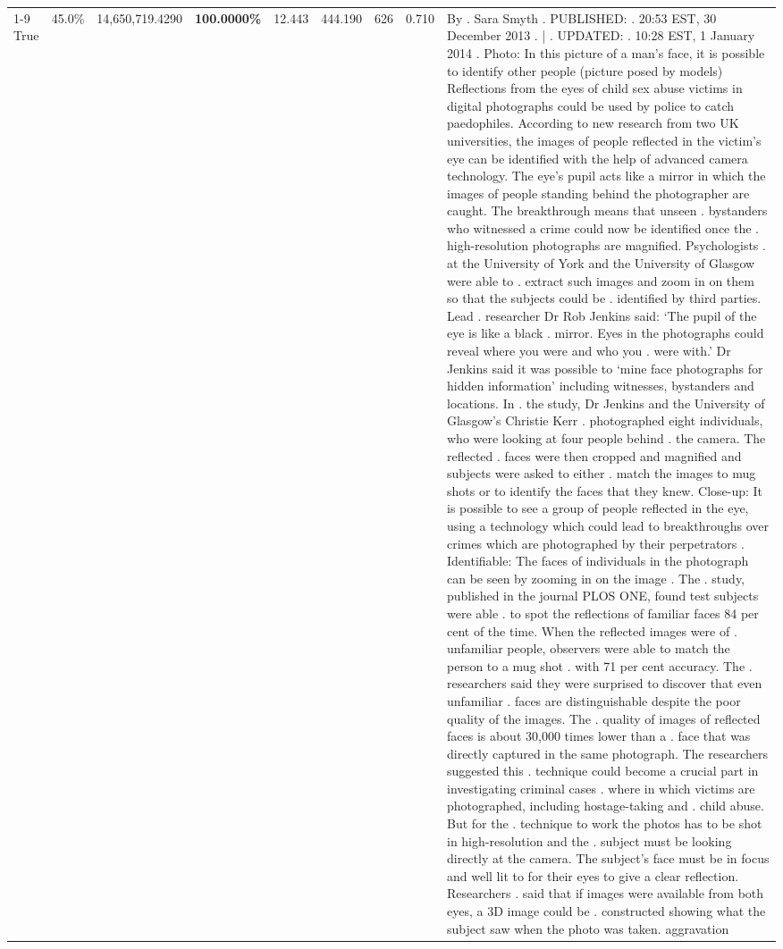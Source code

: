 \begin{table}[H]
\begin{tabular}{lllrlllll}
\cline{1-9}
True & 45.0\% & 14,650,719.4290 & \bfseries \color{red} 100.0000\% & 12.443 & 444.190 & 626 & 0.710 & By . Sara Smyth . PUBLISHED: . 20:53 EST, 30 December 2013 . | . UPDATED: . 10:28 EST, 1 January 2014 . Photo: In this picture of a man's face, it is possible to identify other people (picture posed by models) Reflections from the eyes of child sex abuse victims in digital photographs could be used by police to catch paedophiles. According to new research from two UK universities, the images of people reflected in the victim's eye can be identified with the help of advanced camera technology. The eye's pupil acts like a mirror in which the images of people standing behind the photographer are caught. The breakthrough means that unseen . bystanders who witnessed a crime could now be identified once the . high-resolution photographs are magnified. Psychologists . at the University of York and the University of Glasgow were able to . extract such images and zoom in on them so that the subjects could be . identified by third parties. Lead . researcher Dr Rob Jenkins said: ‘The pupil of the eye is like a black . mirror. Eyes in the photographs could reveal where you were and who you . were with.' Dr Jenkins said it was possible to ‘mine face photographs for hidden information' including witnesses, bystanders and locations. In . the study, Dr Jenkins and the University of Glasgow's Christie Kerr . photographed eight individuals, who were looking at four people behind . the camera. The reflected . faces were then cropped and magnified and subjects were asked to either . match the images to mug shots or to identify the faces that they knew. Close-up: It is possible to see a group of people reflected in the eye, using a technology which could lead to breakthroughs over crimes which are photographed by their perpetrators . Identifiable: The faces of individuals in the photograph can be seen by zooming in on the image . The . study, published in the journal PLOS ONE, found test subjects were able . to spot the reflections of familiar faces 84 per cent of the time. When the reflected images were of . unfamiliar people, observers were able to match the person to a mug shot . with 71 per cent accuracy. The . researchers said they were surprised to discover that even unfamiliar . faces are distinguishable despite the poor quality of the images. The . quality of images of reflected faces is about 30,000 times lower than a . face that was directly captured in the same photograph. The researchers suggested this . technique could become a crucial part in investigating criminal cases . where in which victims are photographed, including hostage-taking and . child abuse. But for the . technique to work the photos has to be shot in high-resolution and the . subject must be looking directly at the camera. The subject's face must be in focus and well lit to for their eyes to give a clear reflection. Researchers . said that if images were available from both eyes, a 3D image could be . constructed showing what the subject saw when the photo was taken. aggravation \\

\end{tabular}
\end{table}
